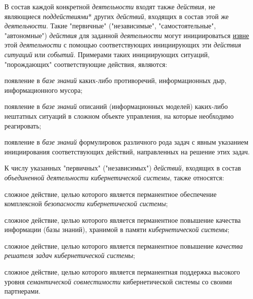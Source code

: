 \begin{SCn}
{В состав каждой конкретной \textit{деятельности} входят также \textit{действия}, не являющиеся \textit{поддействиями}* других \textit{действий}, входящих в состав этой же \textit{деятельности}. Такие "первичные"{} ("независимые"{}, "самостоятельные"{}, "автономные"{}) \textit{действия} для заданной \textit{деятельности} могут инициироваться \uline{извне} этой \textit{деятельности} с помощью соответствующих инициирующих эти \textit{действия ситуаций} или \textit{событий}. Примерами таких инициирующих ситуаций, "порождающих"{} соответствующие действия, являются:
\begin{scnitemize}
	\item появление в \textit{базе знаний} каких-либо противоречий, информационных дыр, информационного мусора;
	\item появление в \textit{базе знаний} описаний (информационных моделей) каких-либо нештатных ситуаций в сложном объекте управления, на которые необходимо реагировать;
	\item появление в \textit{базе знаний} формулировок различного рода задач с явным указанием инициирования соответствующих действий, направленных на решение этих задач.
\end{scnitemize}
	К числу указанных "первичных"{} ("независимых"{}) \textit{действий}, входящих в состав \textit{объединенной деятельности кибернетической системы}, также относятся:
\begin{scnitemize}
	\item сложное действие, целью которого является перманентное обеспечение комплексной \textit{безопасности кибернетической системы};
	\item сложное действие, целью которого является перманентное  повышение качества информации (базы знаний), хранимой в памяти \textit{кибернетической системы};
	\item сложное действие, целью которого является перманентное повышение \textit{качества решателя задач кибернетической системы};
	\item сложное действие, целью которого является перманентная поддержка высокого уровня \textit{семантической совместимости} кибернетической системы со своими партнерами.
\end{scnitemize}
}



\end{SCn}
